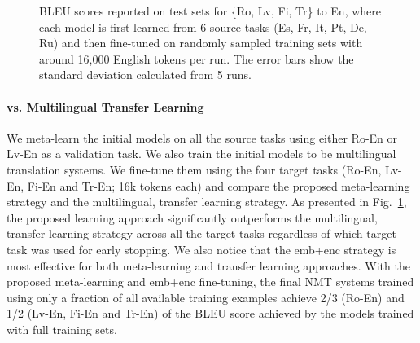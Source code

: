 \begin{figure}[t]
{\begin{minipage}[t]{0.48\linewidth}
\end{minipage}}
\caption{BLEU scores reported on test sets for \{Ro, Lv, Fi, Tr\} to En, where each model is first learned from 6 source tasks (Es, Fr, It, Pt, De, Ru) and then fine-tuned on randomly sampled training sets with around 16,000 English tokens per run. The error bars show the standard deviation calculated from 5 runs.} 
\label{cp6.fig.compare}                                                   
\end{figure}

\paragraph{vs. Multilingual Transfer Learning}

We meta-learn the initial models on all the source tasks using either Ro-En or Lv-En as a validation task. We also train the initial models to be multilingual translation systems. We fine-tune them using the four target tasks (Ro-En, Lv-En, Fi-En and Tr-En; 16k tokens each) and compare the proposed meta-learning strategy and the multilingual, transfer learning strategy. As presented in Fig.~\ref{cp6.fig.compare}, the proposed learning approach significantly outperforms the multilingual, transfer learning strategy across all the target tasks regardless of which target task was used for early stopping. We also notice that the emb+enc strategy is most effective for both meta-learning and transfer learning approaches. With the proposed meta-learning and emb+enc fine-tuning, the final NMT systems trained using only a fraction of all available training examples achieve 2/3 (Ro-En) and 1/2 (Lv-En, Fi-En and Tr-En) of the BLEU score achieved by the models trained with full training sets.

